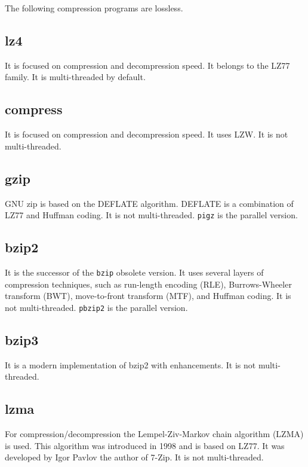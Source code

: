 \documentclass[12pt, a4paper]{report}
\begin{document}
The following compression programs are lossless.

\subsection{lz4}
\label{subsec:lz4}

It is focused on compression and decompression speed.
It belongs to the LZ77 family.
It is multi-threaded by default.

\subsection{compress}
\label{subsec:compress}

It is focused on compression and decompression speed.
It uses LZW.
It is not multi-threaded.

\subsection{gzip}
\label{subsec:gzip}

GNU zip is based on the DEFLATE algorithm.
DEFLATE is a combination of LZ77 and Huffman coding.
It is not multi-threaded.
\texttt{pigz} is the parallel version.

\subsection{bzip2}
\label{subsec:bzip2}

It is the successor of the \texttt{bzip} obsolete version.
It uses several layers of compression techniques, such as run-length encoding (RLE), Burrows-Wheeler transform (BWT),
move-to-front transform (MTF), and Huffman coding.
It is not multi-threaded.
\texttt{pbzip2} is the parallel version.

\subsection{bzip3}
\label{subsec:bzip3}

It is a modern implementation of bzip2 with enhancements.
It is not multi-threaded.

\subsection{lzma}
\label{subsec:lzma}

For compression/decompression the Lempel-Ziv-Markov chain algorithm (LZMA) is used.
This algorithm was introduced in 1998 and is based on LZ77.
It was developed by Igor Pavlov the author of 7-Zip.
It is not multi-threaded.
\end{document}
